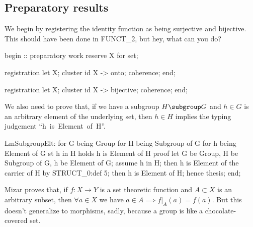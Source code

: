 \subsection{Preparatory results}%

\M
We begin by registering the identity function as being surjective and
bijective. This should have been done in {\Tt{}FUNCT{\_}2\nwendquote}, but hey, what can
you do?

\nwenddocs{}\endmoddef\nwstartdeflinemarkup{}\nwenddeflinemarkup
begin :: preparatory work
reserve X for set;

registration
  let X;
  cluster id X -> onto;
  coherence;
end;

registration
  let X;
  cluster id X -> bijective;
  coherence;
end;

\nwendcode{}\nwdocspar

\M
We also need to prove that, if we have a subgroup $H\subgroup G$ and
$h\in G$ is an arbitrary element of the underlying set, then $h\in H$
implies the typing judgement ``{\Tt{}h\ is\ Element\ of\ H\nwendquote}''.

\nwenddocs{}\plusendmoddef\nwstartdeflinemarkup{}\nwenddeflinemarkup
LmSubgroupElt:
for G being Group
for H being Subgroup of G
for h being Element of G st h in H holds h is Element of H
proof
  let G be Group,
      H be Subgroup of G,
      h be Element of G;
  assume h in H;
  then h is Element of the carrier of H by STRUCT_0:def 5;
  then h is Element of H;
  hence thesis;
end;

\nwendcode{}\nwdocspar

Mizar proves that, if $f\colon X\to Y$ is a set theoretic function and
$A\subset X$ is an arbitrary subset, then $\forall a\in X$ we have
$a\in A\implies f|_{A}(a)=f(a)$. But this doesn't generalize to
morphisms, sadly, because a group is like a chocolate-covered set.

